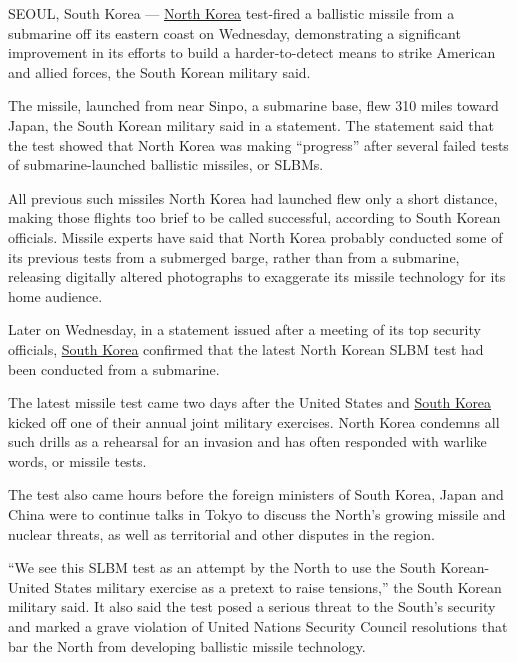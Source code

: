 SEOUL, South Korea ---
\href{http://www.nytimes3xbfgragh.onion/topic/destination/north-korea?8qa}{North
Korea} test-fired a ballistic missile from a submarine off its eastern
coast on Wednesday, demonstrating a significant improvement in its
efforts to build a harder-to-detect means to strike American and allied
forces, the South Korean military said.

The missile, launched from near Sinpo, a submarine base, flew 310 miles
toward Japan, the South Korean military said in a statement. The
statement said that the test showed that North Korea was making
``progress'' after several failed tests of submarine-launched ballistic
missiles, or SLBMs.

All previous such missiles North Korea had launched flew only a short
distance, making those flights too brief to be called successful,
according to South Korean officials. Missile experts have said that
North Korea probably conducted some of its previous tests from a
submerged barge, rather than from a submarine, releasing digitally
altered photographs to exaggerate its missile technology for its home
audience.

Later on Wednesday, in a statement issued after a meeting of its top
security officials,
\href{http://topics.nytimes3xbfgragh.onion/top/news/international/countriesandterritories/southkorea/index.html?inline=nyt-geo}{South
Korea} confirmed that the latest North Korean SLBM test had been
conducted from a submarine.

The latest missile test came two days after the United States and
\href{http://www.nytimes3xbfgragh.onion/topic/destination/south-korea?8qa}{South
Korea} kicked off one of their annual joint military exercises. North
Korea condemns all such drills as a rehearsal for an invasion and has
often responded with warlike words, or missile tests.

The test also came hours before the foreign ministers of South Korea,
Japan and China were to continue talks in Tokyo to discuss the North's
growing missile and nuclear threats, as well as territorial and other
disputes in the region.

``We see this SLBM test as an attempt by the North to use the South
Korean-United States military exercise as a pretext to raise tensions,''
the South Korean military said. It also said the test posed a serious
threat to the South's security and marked a grave violation of United
Nations Security Council resolutions that bar the North from developing
ballistic missile technology.

